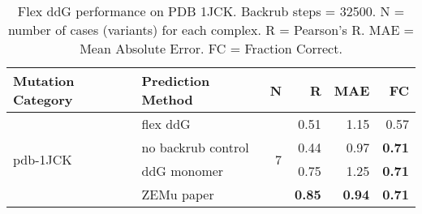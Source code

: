 \begin{table}
  \begin{tabular}{llrrrr}
\toprule
Mutation Category &   Prediction Method &  N &    R &  MAE &   FC \\
\midrule
 \multirow{ 4}{*}{pdb-1JCK} & flex ddG & \multirow{ 4}{*}{7} & 0.51 & 1.15 & 0.57  \\
 & no backrub control & & 0.44 & 0.97 & \textbf{0.71}  \\
 & ddG monomer & & 0.75 & 1.25 & \textbf{0.71}  \\
 & ZEMu paper & & \textbf{0.85} & \textbf{0.94} & \textbf{0.71}  \\
\bottomrule
\end{tabular}
  \caption[Flex ddG performance on PDB 1JCK]{
    Flex ddG performance on PDB 1JCK. Backrub steps = 32500. N = number of cases (variants) for each complex. R = Pearson's R. MAE = Mean Absolute Error. FC = Fraction Correct.
  } \label{tab:table-pdb-1JCK}
\end{table}
